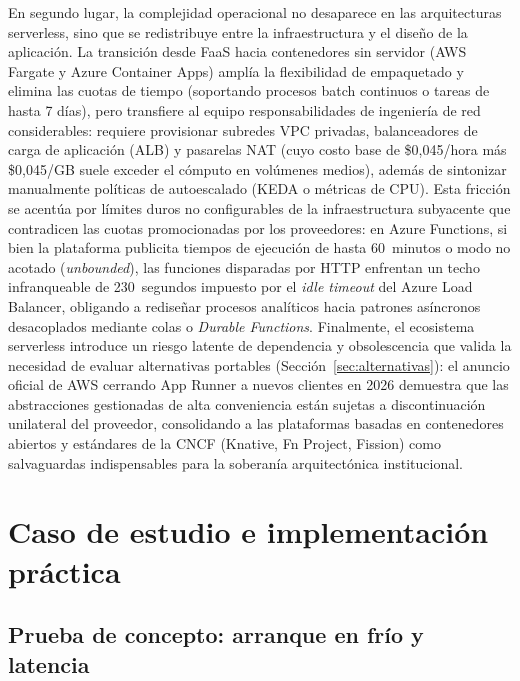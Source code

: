 \documentclass[12pt, letterpaper, table, xcdraw]{inf-pucv}
\begin{document}
En segundo lugar, la complejidad operacional no desaparece en las arquitecturas serverless, sino que se redistribuye entre la infraestructura y el diseño de la aplicación. La transición desde FaaS hacia contenedores sin servidor (AWS Fargate y Azure Container Apps) amplía la flexibilidad de empaquetado y elimina las cuotas de tiempo (soportando procesos batch continuos o tareas de hasta 7 días), pero transfiere al equipo responsabilidades de ingeniería de red considerables: requiere provisionar subredes VPC privadas, balanceadores de carga de aplicación (ALB) y pasarelas NAT (cuyo costo base de \$0,045/hora más \$0,045/GB suele exceder el cómputo en volúmenes medios), además de sintonizar manualmente políticas de autoescalado (KEDA o métricas de CPU). Esta fricción se acentúa por límites duros no configurables de la infraestructura subyacente que contradicen las cuotas promocionadas por los proveedores: en Azure Functions, si bien la plataforma publicita tiempos de ejecución de hasta 60~minutos o modo no acotado (\emph{unbounded}), las funciones disparadas por HTTP enfrentan un techo infranqueable de 230~segundos impuesto por el \emph{idle timeout} del Azure Load Balancer, obligando a rediseñar procesos analíticos hacia patrones asíncronos desacoplados mediante colas o \emph{Durable Functions}. Finalmente, el ecosistema serverless introduce un riesgo latente de dependencia y obsolescencia que valida la necesidad de evaluar alternativas portables (Sección~\ref{sec:alternativas}): el anuncio oficial de AWS cerrando App Runner a nuevos clientes en 2026 demuestra que las abstracciones gestionadas de alta conveniencia están sujetas a discontinuación unilateral del proveedor, consolidando a las plataformas basadas en contenedores abiertos y estándares de la CNCF (Knative, Fn Project, Fission) como salvaguardas indispensables para la soberanía arquitectónica institucional.





\section{Caso de estudio e implementación práctica}


\subsection{Prueba de concepto: arranque en frío y latencia}
\label{sec:poc}
\end{document}
